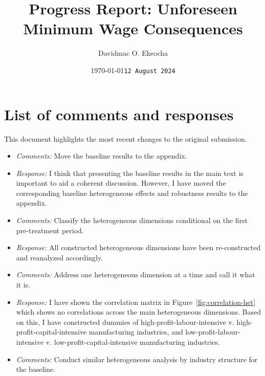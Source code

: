 \documentclass[12pt, english]{article}
\title{{Progress Report: Unforeseen Minimum Wage Consequences}}
\author[1]{Davidmac O. Ekeocha}
\affil[1]{
    University of Liverpool Management School \\
    \texttt{davidmac.ekeocha@liverpool.ac.uk}
}
\date{\today}
\begin{document}
    \maketitle
    \section*{List of comments and responses}
    This document highlights the most recent changes to the original submission.

    \date{\texttt{12 August 2024}}
    \begin{itemize}
        \item \textit{Comments:} Move the baseline results to the appendix.
        \item \textit{Response:} I think that presenting the baseline results in the main text is important to aid a coherent discussion. However, I have moved the corresponding baseline heterogeneous effects and robustness results to the appendix.
        \item \textit{Comments:} Classify the heterogeneous dimensions conditional on the first pre-treatment period.
        \item \textit{Response:} All constructed heterogeneous dimensions have been re-constructed and reanalyzed accordingly.
        \item \textit{Comments:} Address one heterogeneous dimension at a time and call it what it is.
        \item \textit{Response:} I have shown the correlation matrix in Figure~\ref{fig:correlation-het} which shows no correlations across the main heterogeneous dimensions. Based on this, I have constructed dummies of high-profit-labour-intensive v. high-profit-capital-intensive manufacturing industries, and low-profit-labour-intensive v. low-profit-capital-intensive manufacturing industries. 
        \item \textit{Comments:} Conduct similar heterogeneous analysis by industry structure for the baseline.

\end{itemize}
\end{document}
